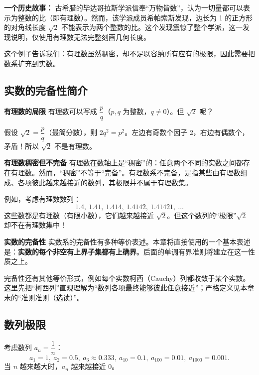 \documentclass[fontset=fandol]{ctexart}
\newenvironment{custom}[1]{\par\noindent\textbf{#1}\quad}{\par\vspace{0.8em}}
\begin{document}
\textbf{一个历史故事：} 古希腊的毕达哥拉斯学派信奉“万物皆数”，认为一切量都可以表示为整数的比（即有理数）。然而，该学派成员希帕索斯发现，边长为 1 的正方形的对角线长度 \(\sqrt{2}\) 不能表示为两个整数的比。这个发现震惊了整个学派，这一发现说明，仅使用有理数无法完整刻画几何长度。

这个例子告诉我们：有理数虽然稠密，却不足以容纳所有应有的极限，因此需要把数系扩充到实数。

\subsection{实数的完备性简介}

\begin{custom}{有理数的局限}
有理数可以写成 \(\dfrac{p}{q}\)（\(p,q\) 为整数，\(q \neq 0\)）。但 \(\sqrt{2}\) 呢？

假设 \(\sqrt{2} = \dfrac{p}{q}\)（最简分数），则 \(2q^2 = p^2\)。左边有奇数个因子 2，右边有偶数个，矛盾！所以 \(\sqrt{2}\) 不是有理数。
\end{custom}

\begin{custom}{有理数稠密但不完备}
有理数在数轴上是“稠密”的：任意两个不同的实数之间都存在有理数。然而，“稠密”不等于“完备”。有理数系不完备，是指某些由有理数组成、各项彼此越来越接近的数列，其极限并不属于有理数集。

例如，考虑有理数数列：
\[
1.4,\ 1.41,\ 1.414,\ 1.4142,\ 1.41421,\ \dots
\]
这些数都是有理数（有限小数），它们越来越接近 \(\sqrt{2}\)。但这个数列的“极限”\(\sqrt{2}\) 却不在有理数集中！
\end{custom}

\begin{custom}{实数的完备性}
实数系的完备性有多种等价表述。本章将直接使用的一个基本表述是：\textbf{实数的每个非空有上界子集都有上确界}。后面的单调有界准则将建立在这一性质之上。

完备性还有其他等价形式，例如每个实数柯西（Cauchy）列都收敛于某个实数。这里先把“柯西列”直观理解为“数列各项最终能够彼此任意接近”；严格定义见本章末的“准则准则（选读）”。
\end{custom}

\fi


\subsection{数列极限}

考虑数列 \(a_n = \dfrac{1}{n}\)：
\[
a_1=1,\ a_2=0.5,\ a_3\approx 0.333,\ a_{10}=0.1,\ a_{100}=0.01,\ a_{1000}=0.001.
\]
当 \(n\) 越来越大时，\(a_n\) 越来越接近 0。
\end{document}
